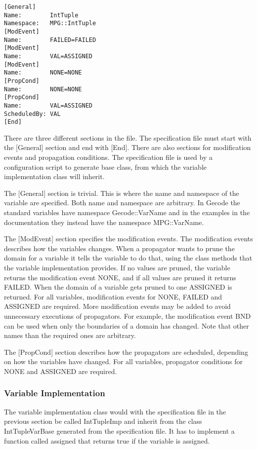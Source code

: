 \documentclass[a4paper,11pt]{article}
\begin{document}
\begin{lstlisting}[frame=single]
[General]
Name:        IntTuple
Namespace:   MPG::IntTuple
[ModEvent]
Name:        FAILED=FAILED
[ModEvent]
Name:        VAL=ASSIGNED
[ModEvent]
Name:        NONE=NONE
[PropCond]
Name:        NONE=NONE
[PropCond]
Name:        VAL=ASSIGNED
ScheduledBy: VAL
[End]
\end{lstlisting}
There are three different sections in the file. The specification file must start with the [General] section and end with [End]. There are also sections for modification events and propagation conditions. The specification file is used by a configuration script to generate base class, from which the variable implementation class will inherit.

The [General] section is trivial. This is where the name and namespace of the variable are specified. Both name and namespace are arbitrary. In Gecode the standard variables have namespace Gecode::VarName and in the examples in the documentation they instead have the namespace MPG::VarName.

The [ModEvent] section specifies the modification events. The modification events describes how the variables changes. When a propagator wants to prune the domain for a variable it tells the variable to do that, using the class methods that the variable implementation provides. If no values are pruned, the variable returns the modification event NONE, and if all values are pruned it returns FAILED. When the domain of a variable gets pruned to one ASSIGNED is returned. For all variables, modification events for NONE, FAILED and ASSIGNED are required. More modification events may be added to avoid unnecessary executions of propagators. For example, the modification event BND can be used when only the boundaries of a domain has changed. Note that other names than the required ones are arbitrary.

The [PropCond] section describes how the propagators are scheduled, depending on how the variables have changed. For all variables, propagator conditions for NONE and ASSIGNED are required.

\subsubsection{Variable Implementation}
The variable implementation class would with the specification file in the previous section be called IntTupleImp and inherit from the class IntTupleVarBase generated from the specification file. It has to implement a function called assigned that returns true if the variable is assigned.
\end{document}
